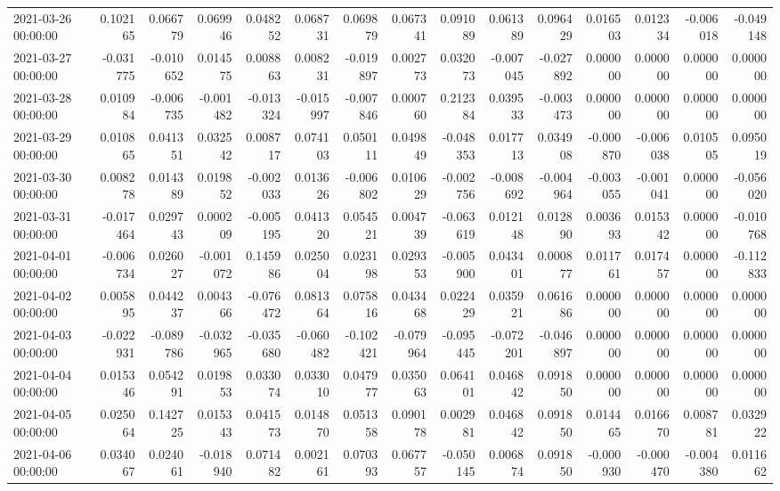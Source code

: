 \begin{tabular}{lrrrrrrrrrrrrrr}
2021-03-26 00:00:00 & 0.102165 & 0.066779 & 0.069946 & 0.048252 & 0.068731 & 0.069879 & 0.067341 & 0.091089 & 0.061389 & 0.096429 & 0.016503 & 0.012334 & -0.006018 & -0.049148 \\
2021-03-27 00:00:00 & -0.031775 & -0.010652 & 0.014575 & 0.008863 & 0.008231 & -0.019897 & 0.002773 & 0.032073 & -0.007045 & -0.027892 & 0.000000 & 0.000000 & 0.000000 & 0.000000 \\
2021-03-28 00:00:00 & 0.010984 & -0.006735 & -0.001482 & -0.013324 & -0.015997 & -0.007846 & 0.000760 & 0.212384 & 0.039533 & -0.003473 & 0.000000 & 0.000000 & 0.000000 & 0.000000 \\
2021-03-29 00:00:00 & 0.010865 & 0.041351 & 0.032542 & 0.008717 & 0.074103 & 0.050111 & 0.049849 & -0.048353 & 0.017713 & 0.034908 & -0.000870 & -0.006038 & 0.010505 & 0.095019 \\
2021-03-30 00:00:00 & 0.008278 & 0.014389 & 0.019852 & -0.002033 & 0.013626 & -0.006802 & 0.010629 & -0.002756 & -0.008692 & -0.004964 & -0.003055 & -0.001041 & 0.000000 & -0.056020 \\
2021-03-31 00:00:00 & -0.017464 & 0.029743 & 0.000209 & -0.005195 & 0.041320 & 0.054521 & 0.004739 & -0.063619 & 0.012148 & 0.012890 & 0.003693 & 0.015342 & 0.000000 & -0.010768 \\
2021-04-01 00:00:00 & -0.006734 & 0.026027 & -0.001072 & 0.145986 & 0.025004 & 0.023198 & 0.029353 & -0.005900 & 0.043401 & 0.000877 & 0.011761 & 0.017457 & 0.000000 & -0.112833 \\
2021-04-02 00:00:00 & 0.005895 & 0.044237 & 0.004366 & -0.076472 & 0.081364 & 0.075816 & 0.043468 & 0.022429 & 0.035921 & 0.061686 & 0.000000 & 0.000000 & 0.000000 & 0.000000 \\
2021-04-03 00:00:00 & -0.022931 & -0.089786 & -0.032965 & -0.035680 & -0.060482 & -0.102421 & -0.079964 & -0.095445 & -0.072201 & -0.046897 & 0.000000 & 0.000000 & 0.000000 & 0.000000 \\
2021-04-04 00:00:00 & 0.015346 & 0.054291 & 0.019853 & 0.033074 & 0.033010 & 0.047977 & 0.035063 & 0.064101 & 0.046842 & 0.091850 & 0.000000 & 0.000000 & 0.000000 & 0.000000 \\
2021-04-05 00:00:00 & 0.025064 & 0.142725 & 0.015343 & 0.041573 & 0.014870 & 0.051358 & 0.090178 & 0.002981 & 0.046842 & 0.091850 & 0.014465 & 0.016670 & 0.008781 & 0.032922 \\
2021-04-06 00:00:00 & 0.034067 & 0.024061 & -0.018940 & 0.071482 & 0.002161 & 0.070393 & 0.067757 & -0.050145 & 0.006874 & 0.091850 & -0.000930 & -0.000470 & -0.004380 & 0.011662 \\

\end{tabular}
